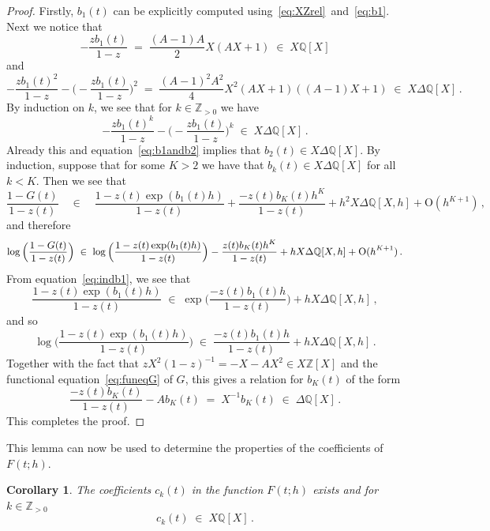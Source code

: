 \documentclass[12pt,reqno]{amsart}
\newtheorem{corollary}[proposition]{Corollary}
\theoremstyle{definition}
\def\BZ{\mathbb Z}
\def\BQ{\mathbb Q}
\def\be{\begin{equation}}
\def\ee{\end{equation}}
\def\={\;=\;}
\def\inn{\;\in\;}
\begin{document}
\begin{proof}
Firstly, $b_{1}(t)$ can be explicitly computed using~\eqref{eq:XZrel}~and~\eqref{eq:b1}.
Next we notice that
\be
-\frac{zb_{1}(t)}{1-z} \= \frac{(A-1)A}{2}X(AX+1)\inn X\BQ[X]
\ee
and
\be
-\frac{zb_{1}(t)^2}{1-z} - \Big(-\frac{zb_{1}(t)}{1-z}\Big)^2
\= \frac{(A-1)^2A^2}{4}X^2(AX+1)((A-1)X+1) \inn X\Delta\BQ[X]\,.
\ee
By induction on $k$, we see that for $k\in\BZ_{>0}$ we have
\be
\label{eq:indb1}
-\frac{zb_{1}(t)^k}{1-z} - \Big(-\frac{zb_{1}(t)}{1-z}\Big)^k
\inn X\Delta\BQ[X]\,.
\ee
Already this and equation~\eqref{eq:b1andb2} implies that
$b_{2}(t)\in X\Delta\BQ[X]$. By induction, suppose that for some $K>2$
we have that $b_{k}(t)\in X\Delta\BQ[X]$ for all $k<K$. Then we
see that
\be
\frac{1-G(t)}{1-z(t)}\quad\in\quad
\frac{1-z(t)\exp(b_{1}(t)h)}{1-z(t)} + \frac{-z(t)b_{K}(t)h^K}{1-z(t)}
+ h^2 X\Delta\BQ[X,h] + \mathrm{O}(h^{K+1})\,,
\ee
and therefore
\be
\begin{small}
\begin{aligned}
\log\Big(\frac{1-G(t)}{1-z(t)}\Big)
\inn \log\Big(\frac{1-z(t)\exp(b_{1}(t)h)}{1-z(t)}\Big)
- \frac{z(t)b_{K}(t)h^K}{1-z(t)} + h X\Delta\BQ[X,h]
+ \mathrm{O}(h^{K+1})\,.
\end{aligned}
\end{small}
\ee
From equation~\eqref{eq:indb1}, we see that
\be
\frac{1-z(t)\exp(b_{1}(t)h)}{1-z(t)} \inn
\exp\Big(\frac{-z(t)b_{1}(t)h}{1-z(t)}\Big)+h X\Delta\BQ[X,h]\,,
\ee
and so
\be
\log\Big(\frac{1-z(t)\exp(b_{1}(t)h)}{1-z(t)}\Big)
\inn \frac{-z(t)b_{1}(t)h}{1-z(t)} +h X\Delta\BQ[X,h]\,.
\ee
Together with the fact that $zX^2(1-z)^{-1}=-X-AX^2\in X\BZ[X]$
and the functional equation~\eqref{eq:funeqG} of $G$, this gives a relation
for $b_{K}(t)$ of the form
\be
\frac{-z(t)b_{K}(t)}{1-z(t)} -Ab_{K}(t) \= X^{-1}b_{K}(t) \inn \Delta\BQ[X]\,.
\ee
This completes the proof.
\end{proof}
This lemma can now be used to determine the properties of the coefficients of $F(t;h)$.

\begin{corollary}
The coefficients $c_{k}(t)$ in the function $F(t;h)$ exists and for $k\in\BZ_{>0}$
\be
c_{k}(t)\inn X\BQ[X]\,.
\ee
\end{corollary}
\end{document}
